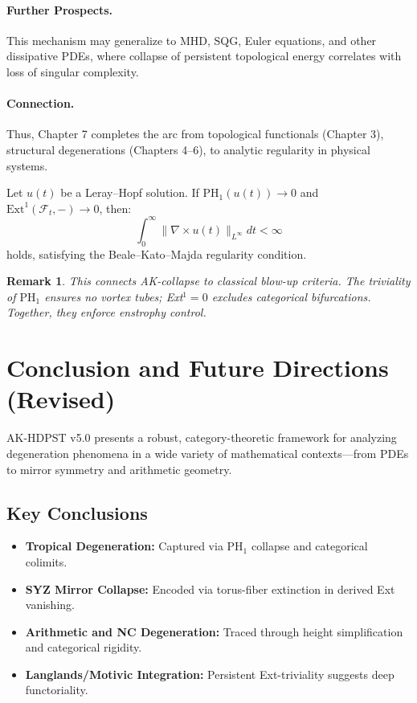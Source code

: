 \documentclass[11pt]{article}
\newtheorem{remark}[theorem]{Remark}
\begin{document}
\paragraph{Further Prospects.}
This mechanism may generalize to MHD, SQG, Euler equations, and other dissipative PDEs, where collapse of persistent topological energy correlates with loss of singular complexity.

\paragraph{Connection.}
Thus, Chapter 7 completes the arc from topological functionals (Chapter 3), structural degenerations (Chapters 4–6), to analytic regularity in physical systems.

\begin{lemma}
Let $u(t)$ be a Leray--Hopf solution. If $\mathrm{PH}_1(u(t)) \to 0$ and $\mathrm{Ext}^1(\mathcal{F}_t, -) \to 0$, then:
\[
\int_0^\infty \|\nabla \times u(t)\|_{L^\infty} dt < \infty
\]
holds, satisfying the Beale–Kato–Majda regularity condition.
\end{lemma}

\begin{remark}
This connects AK-collapse to classical blow-up criteria. The triviality of $\mathrm{PH}_1$ ensures no vortex tubes; Ext$^1 = 0$ excludes categorical bifurcations. Together, they enforce enstrophy control.
\end{remark}



\section{Conclusion and Future Directions (Revised)}

AK-HDPST v5.0 presents a robust, category-theoretic framework for analyzing degeneration phenomena in a wide variety of mathematical contexts—from PDEs to mirror symmetry and arithmetic geometry.

\subsection*{Key Conclusions}
\begin{itemize}
    \item \textbf{Tropical Degeneration:} Captured via PH\(_1\) collapse and categorical colimits.
    \item \textbf{SYZ Mirror Collapse:} Encoded via torus-fiber extinction in derived Ext vanishing.
    \item \textbf{Arithmetic and NC Degeneration:} Traced through height simplification and categorical rigidity.
    \item \textbf{Langlands/Motivic Integration:} Persistent Ext-triviality suggests deep functoriality.
\end{itemize}
\end{document}
